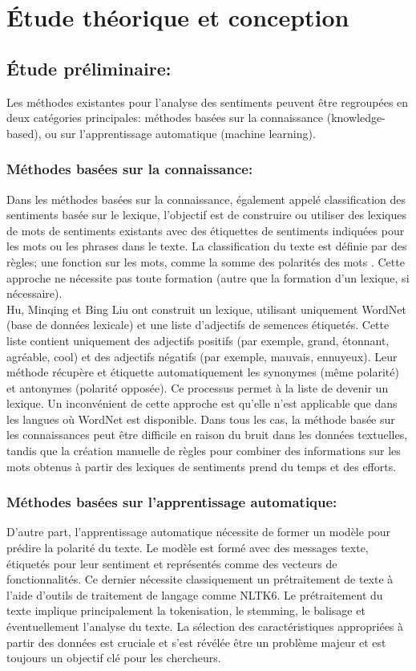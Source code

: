 \chapter{Étude théorique et conception}
\section{Étude préliminaire:}
Les méthodes existantes pour l'analyse des sentiments peuvent être regroupées en deux catégories principales: méthodes basées sur la connaissance (knowledge-based), ou sur l'apprentissage automatique (machine learning). \\
\subsection{Méthodes basées sur la connaissance: }
Dans les méthodes basées sur la connaissance, également appelé classification des sentiments basée sur le lexique, l'objectif est de
construire ou utiliser des lexiques de mots de sentiments existants avec des étiquettes de sentiments indiquées pour les mots
ou les phrases dans le texte. La classification du texte est définie par des règles; une fonction sur les mots, comme la somme des polarités des mots \cite{taboada2011lexicon}. Cette approche ne nécessite pas
toute formation (autre que la formation d'un lexique, si nécessaire). \\

Hu, Minqing et Bing Liu \cite{hu2004mining} ont construit un lexique, utilisant uniquement WordNet (base de données lexicale) et une liste d'adjectifs de semences étiquetés. Cette liste contient uniquement des adjectifs positifs (par exemple, grand, étonnant, agréable, cool) et des adjectifs négatifs (par exemple, mauvais, ennuyeux). Leur méthode récupère et étiquette automatiquement les synonymes (même polarité) et antonymes (polarité opposée). Ce processus permet à la liste de devenir un lexique. Un inconvénient de cette approche est qu'elle n'est applicable que dans les langues où WordNet est disponible. Dans tous les cas, la méthode basée sur les connaissances peut être difficile en raison du bruit dans les données textuelles, tandis que la création manuelle de règles pour combiner des informations sur les mots obtenus à partir des lexiques de sentiments prend du temps et des efforts.\\
\subsection{Méthodes basées sur l'apprentissage automatique: }
D'autre part, l'apprentissage automatique nécessite de former un modèle pour prédire la polarité du texte. Le modèle est formé avec des messages texte, étiquetés pour leur sentiment et représentés comme des vecteurs de fonctionnalités. Ce dernier nécessite classiquement un prétraitement de texte à l'aide d'outils de traitement de langage comme NLTK6. Le prétraitement du texte implique principalement la tokenisation, le stemming, le balisage et éventuellement l'analyse du texte. La sélection des caractéristiques appropriées à partir des données est cruciale et s'est révélée être un problème majeur et est toujours un objectif clé pour les chercheurs.\\

